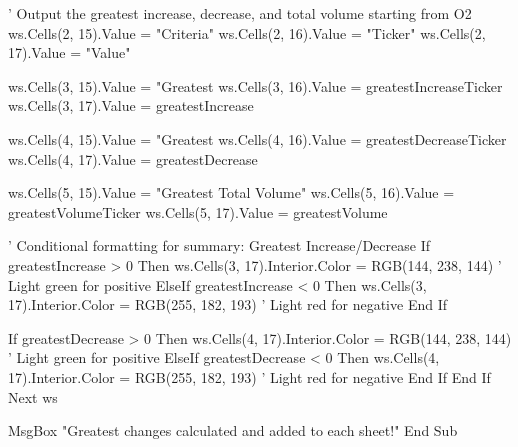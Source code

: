             ' Output the greatest increase, decrease, and total volume starting from O2
            ws.Cells(2, 15).Value = "Criteria"
            ws.Cells(2, 16).Value = "Ticker"
            ws.Cells(2, 17).Value = "Value"

            ws.Cells(3, 15).Value = "Greatest %
            ws.Cells(3, 16).Value = greatestIncreaseTicker
            ws.Cells(3, 17).Value = greatestIncrease

            ws.Cells(4, 15).Value = "Greatest %
            ws.Cells(4, 16).Value = greatestDecreaseTicker
            ws.Cells(4, 17).Value = greatestDecrease

            ws.Cells(5, 15).Value = "Greatest Total Volume"
            ws.Cells(5, 16).Value = greatestVolumeTicker
            ws.Cells(5, 17).Value = greatestVolume
            
            ' Conditional formatting for summary: Greatest Increase/Decrease
            If greatestIncrease > 0 Then
                ws.Cells(3, 17).Interior.Color = RGB(144, 238, 144) ' Light green for positive
            ElseIf greatestIncrease < 0 Then
                ws.Cells(3, 17).Interior.Color = RGB(255, 182, 193) ' Light red for negative
            End If
            
            If greatestDecrease > 0 Then
                ws.Cells(4, 17).Interior.Color = RGB(144, 238, 144) ' Light green for positive
            ElseIf greatestDecrease < 0 Then
                ws.Cells(4, 17).Interior.Color = RGB(255, 182, 193) ' Light red for negative
            End If
        End If
    Next ws
    
    MsgBox "Greatest changes calculated and added to each sheet!"
End Sub

